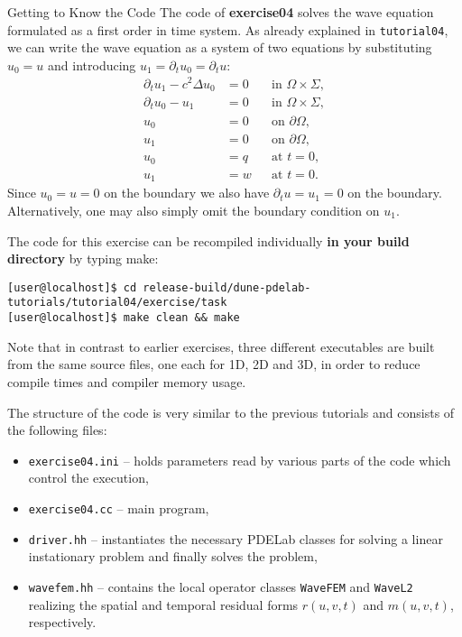 \documentclass[12pt,a4paper]{article}
\begin{document}
\begin{Exercise}{Getting to Know the Code}
  \lstset{language=bash} The code of \textbf{exercise04} solves the
  wave equation formulated as a first order in time system. As already
  explained in \lstinline{tutorial04}, we can write the wave equation
  as a system of two equations by substituting $u_0=u$ and introducing
  $u_1=\partial_t u_0 =\partial_t u$:
  \begin{subequations}
    \label{eq:SystemForm1}
    \begin{align}
      \partial_t u_1 - c^2\Delta u_0 &=0 &&\text{in $\Omega\times\Sigma$}, \label{eq:2a}\\
      \partial_t u_0 - u_1 &=0 &&\text{in $\Omega\times\Sigma$}, \label{eq:2b}\\
      u_0 &= 0 &&\text{on $\partial\Omega$},\\
      u_1 &= 0 &&\text{on $\partial\Omega$},\\
      u_0 &= q &&\text{at $t=0$},\\
      u_1 &= w &&\text{at $t=0$}.
    \end{align}
  \end{subequations}
  Since $u_0=u=0$ on the boundary we also have
  $\partial_t u = u_1 = 0$ on the boundary.  Alternatively, one may
  also simply omit the boundary condition on $u_1$.


  The code for this exercise can be recompiled individually \textbf{in
    your build directory} by typing make:
  \begin{lstlisting}
[user@localhost]$ cd release-build/dune-pdelab-tutorials/tutorial04/exercise/task
[user@localhost]$ make clean && make
  \end{lstlisting}

  Note that in contrast to earlier exercises, three different
  executables are built from the same source files, one each for 1D,
  2D and 3D, in order to reduce compile times and compiler memory
  usage.

  The structure of the code is very similar to the previous tutorials
  and consists of the following files:
  \begin{itemize}
  \item \lstinline!exercise04.ini! -- holds parameters read by various
    parts of the code which control the execution,
  \item \lstinline!exercise04.cc! -- main program,
  \item \lstinline!driver.hh! -- instantiates the necessary PDELab
    classes for solving a linear instationary problem and finally
    solves the problem,
  \item \lstinline!wavefem.hh! -- contains the local operator classes
    \lstinline!WaveFEM! and \lstinline!WaveL2! realizing the spatial
    and temporal residual forms $r(u,v,t)$ and $m(u,v,t)$,
    respectively.
  \end{itemize}


\end{Exercise}
\end{document}
